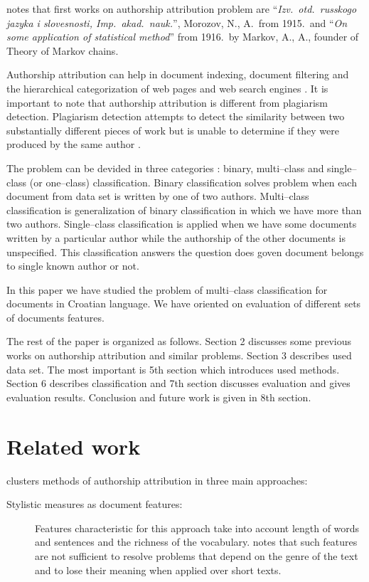 \documentclass[11pt,english]{article}
\begin{document}
\begin{multicols}{2}
\citet{kukushkina2001using} notes that first works on authorship attribution
problem are ``\emph{Izv.\ otd.\ russkogo jazyka i slovesnosti, Imp.\ akad.\ nauk.}'',
Morozov, N., A.\ from 1915.\  and ``\emph{On some application of statistical
method}'' from 1916.\ by Markov, A., A., founder of Theory of Markov chains.

Authorship attribution can help in document indexing, document filtering and the
hierarchical categorization of web pages and web search engines
\citep{luyckx2005shallow}. It is important to note that authorship attribution is
different from plagiarism detection. Plagiarism detection attempts to detect the
similarity between two substantially different pieces of work but is unable to
determine if they were produced by the same author \citep{de2001mining}.

The problem can be devided in three categories \citep{zhao2005effective}: binary,
multi--class and single--class (or one--class) classification. Binary
classification solves problem when each document from data set is written by one
of two authors. Multi--class classification is generalization of binary
classification in which we have more than two authors. Single--class
classification is applied when we have some documents written by a particular
author while the authorship of the other documents is unspecified. This
classification answers the question does goven document belongs to single known
author or not.

In this paper we have studied the problem of multi--class classification for
documents in Croatian language. We have oriented on evaluation of different sets
of documents features.

The rest of the paper is organized as follows. Section 2 discusses some previous
works on authorship attribution and similar problems. Section 3 describes used
data set. The most important is 5th section which introduces used methods.
Section 6 describes classification and 7th section discusses evaluation and
gives evaluation results. Conclusion and future work is given in 8th section.

\section{Related work}
\citet{coyotl2006authorship} clusters methods of authorship attribution in
three main approaches:
\begin{description}
\item[Stylistic measures as document features:] Features characteristic for this
approach take into account length of words and sentences and the richness of the
vocabulary. \citet{coyotl2006authorship} notes that such features are not
sufficient to resolve problems that depend on the genre of the text and to lose
their meaning when applied over short texts.


\end{description}
\end{multicols}
\end{document}
